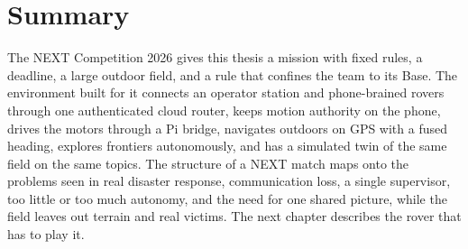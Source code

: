 \section{Summary}

The NEXT Competition 2026 gives this thesis a mission with fixed rules, a deadline, a large outdoor field, and a rule that confines the team to its Base.
The environment built for it connects an operator station and phone-brained rovers through one authenticated cloud router, keeps motion authority on the phone, drives the motors through a Pi bridge, navigates outdoors on GPS with a fused heading, explores frontiers autonomously, and has a simulated twin of the same field on the same topics.
The structure of a NEXT match maps onto the problems seen in real disaster response, communication loss, a single supervisor, too little or too much autonomy, and the need for one shared picture, while the field leaves out terrain and real victims.
The next chapter describes the rover that has to play it.
